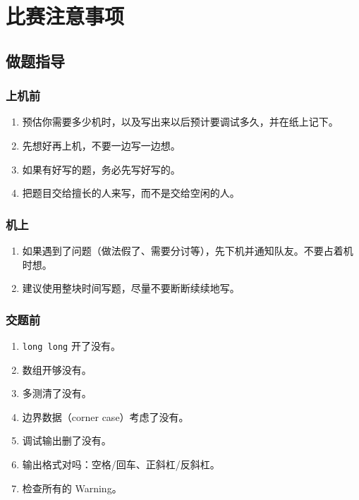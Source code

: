 \section{比赛注意事项}

\subsection{做题指导}

\subsubsection{上机前}
\begin{enumerate}[leftmargin=5mm]
  \setlength{\itemsep}{0pt}
  \item 预估你需要多少机时，以及写出来以后预计要调试多久，并在纸上记下。
  \item 先想好再上机，不要一边写一边想。
  \item 如果有好写的题，务必先写好写的。
  \item 把题目交给擅长的人来写，而不是交给空闲的人。
\end{enumerate}

\subsubsection{机上}
\begin{enumerate}[leftmargin=5mm]
  \setlength{\itemsep}{0pt}
  \item 如果遇到了问题（做法假了、需要分讨等），先下机并通知队友。不要占着机时想。
  \item 建议使用整块时间写题，尽量不要断断续续地写。
\end{enumerate}

\subsubsection{交题前}
\begin{enumerate}[leftmargin=5mm]
  \setlength{\itemsep}{0pt}
  \item \texttt{long long} 开了没有。
  \item 数组开够没有。
  \item 多测清了没有。
  \item 边界数据（corner case）考虑了没有。
  \item 调试输出删了没有。
  \item 输出格式对吗：空格/回车、正斜杠/反斜杠。
  \item 检查所有的 Warning。
\end{enumerate}

